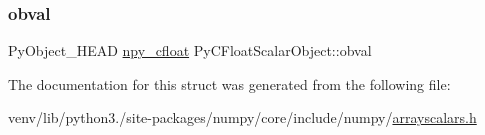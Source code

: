 \subsubsection{\texorpdfstring{obval}{obval}}
{\footnotesize\ttfamily Py\+Object\+\_\+\+H\+E\+AD \hyperlink{structnpy__cfloat}{npy\+\_\+cfloat} Py\+C\+Float\+Scalar\+Object\+::obval}



The documentation for this struct was generated from the following file\+:\begin{DoxyCompactItemize}
\item 
venv/lib/python3./site-\/packages/numpy/core/include/numpy/\hyperlink{arrayscalars_8h}{arrayscalars.\+h}\end{DoxyCompactItemize}
